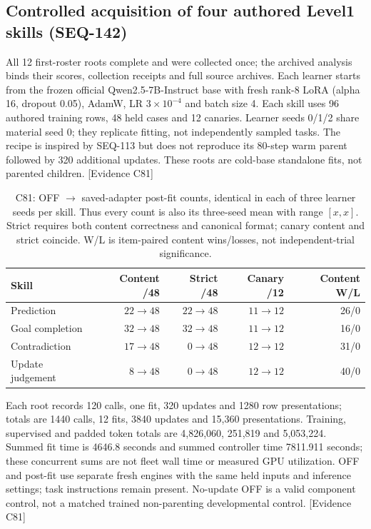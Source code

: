\documentclass[11pt]{article}
\begin{document}
\subsection{Controlled acquisition of four authored Level1 skills (SEQ-142)}
\label{sec:bounded-level1}
All 12 first-roster roots complete and were collected once; the archived analysis
binds their scores, collection receipts and full source archives. Each learner
starts from the frozen official Qwen2.5-7B-Instruct base with fresh rank-8 LoRA
(alpha 16, dropout 0.05), AdamW, LR $3\times10^{-4}$ and batch size 4. Each skill
uses 96 authored training rows, 48 held cases and 12 canaries. Learner seeds 0/1/2
share material seed 0; they replicate fitting, not independently sampled tasks.
The recipe is inspired by SEQ-113 but does not reproduce its 80-step warm parent
followed by 320 additional updates. These roots are cold-base standalone fits,
not parented children. \textsf{[Evidence C81]}

\begin{table}[htbp]
\centering\small
\begin{tabular}{lrrrr}
\toprule
Skill & Content /48 & Strict /48 & Canary /12 & Content W/L \\
\midrule
Prediction & $22\to48$ & $22\to48$ & $11\to12$ & 26/0 \\
Goal completion & $32\to48$ & $32\to48$ & $11\to12$ & 16/0 \\
Contradiction & $17\to48$ & $0\to48$ & $12\to12$ & 31/0 \\
Update judgement & $8\to48$ & $0\to48$ & $12\to12$ & 40/0 \\
\bottomrule
\end{tabular}
\caption{C81: OFF $\to$ saved-adapter post-fit counts, identical in each of three
learner seeds per skill. Thus every count is also its three-seed mean with
range $[x,x]$. Strict requires both content correctness and canonical format;
canary content and strict coincide. W/L is item-paired content wins/losses,
not independent-trial significance.}
\label{tab:bounded-level1}
\end{table}

Each root records 120 calls, one fit, 320 updates and 1280 row presentations;
totals are 1440 calls, 12 fits, 3840 updates and 15,360 presentations. Training,
supervised and padded token totals are 4,826,060, 251,819 and 5,053,224.
Summed fit time is 4646.8 seconds and summed controller time 7811.911 seconds;
these concurrent sums are not fleet wall time or measured GPU utilization.
OFF and post-fit use separate fresh engines with the same held inputs and
inference settings; task instructions remain present. No-update OFF is a valid
component control, not a matched trained non-parenting developmental control.
\textsf{[Evidence C81]}
\end{document}
